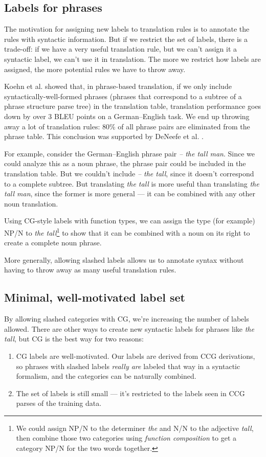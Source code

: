 \documentclass[a4paper]{article}
\begin{document}
\subsection{Labels for phrases}

The motivation for assigning new labels to translation rules is to annotate the rules with syntactic information. But if we restrict the set of labels, there is a trade-off: if we have a very useful translation rule, but we can't assign it a syntactic label, we can't use it in translation. The more we restrict how labels are assigned, the more potential rules we have to throw away.

Koehn et al.  showed that, in phrase-based translation, if we only include syntactically-well-formed phrases (phrases that correspond to a subtree of a phrase structure parse tree) in the translation table, translation performance goes down by over 3 BLEU points on a German--English task. We end up throwing away a lot of translation rules: 80\% of all phrase pairs are eliminated from the phrase table. This conclusion was supported by DeNeefe et al. .

For example, consider the German--English phrase pair {\em  -- the tall man}. Since we could analyze this as a noun phrase, the phrase pair could be included in the translation table. But we couldn't include {\em -- the tall}, since it doesn't correspond to a complete subtree. But translating {\em the tall} is more useful than translating {\em the tall man}, since the former is more general --- it can be combined with any other noun translation.

Using CG-style labels with function types, we can assign the type (for example) NP/N to {\em the tall}\footnote{We could assign NP/N to the determiner {\em the} and N/N to the adjective {\em tall}, then combine those two categories using {\em function composition} to get a category NP/N for the two words together.} to show that it can be combined with a noun on its right to create a complete noun phrase.

More generally, allowing slashed labels allows us to annotate syntax without having to throw away as many useful translation rules.

\subsection{Minimal, well-motivated label set}

By allowing slashed categories with CG, we're increasing the number of labels allowed. There are other ways to create new syntactic labels for phrases like {\em the tall}, but CG is the best way for two reasons:
\begin{enumerate}
\item CG labels are well-motivated. Our labels are derived from CCG derivations, so phrases with slashed labels {\em really are} labeled that way in a syntactic formalism, and the categories can be naturally combined.
\item The set of labels is still small --- it's restricted to the labels seen in CCG parses of the training data.
\end{enumerate}
\end{document}
